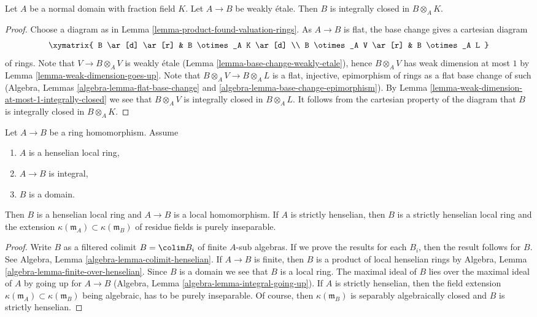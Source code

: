 \begin{lemma}
\label{lemma-normality-goes-up}
Let $A$ be a normal domain with fraction field $K$.
Let $A \to B$ be weakly \'etale. Then
$B$ is integrally closed in $B \otimes_A K$.
\end{lemma}

\begin{proof}
Choose a diagram as in Lemma \ref{lemma-product-found-valuation-rings}.
As $A \to B$ is flat, the base change gives a cartesian diagram
$$
\xymatrix{
B \ar[d] \ar[r] & B \otimes_A K \ar[d] \\
B \otimes_A V \ar[r] & B \otimes_A L
}
$$
of rings. Note that $V \to B \otimes_A V$ is weakly \'etale
(Lemma \ref{lemma-base-change-weakly-etale}), hence $B \otimes_A V$
has weak dimension at most $1$ by Lemma \ref{lemma-weak-dimension-goes-up}.
Note that $B \otimes_A V \to B \otimes_A L$ is a flat, injective,
epimorphism of rings as a flat base change of such
(Algebra, Lemmas \ref{algebra-lemma-flat-base-change} and
\ref{algebra-lemma-base-change-epimorphism}).
By Lemma \ref{lemma-weak-dimension-at-most-1-integrally-closed}
we see that $B \otimes_A V$ is integrally closed in $B \otimes_A L$.
It follows from the cartesian property of the diagram
that $B$ is integrally closed in $B \otimes_A K$.
\end{proof}

\begin{lemma}
\label{lemma-integral-over-henselian}
Let $A \to B$ be a ring homomorphism.
Assume
\begin{enumerate}
\item $A$ is a henselian local ring,
\item $A \to B$ is integral,
\item $B$ is a domain.
\end{enumerate}
Then $B$ is a henselian local ring and $A \to B$ is a local homomorphism.
If $A$ is strictly henselian, then $B$ is a strictly henselian local ring
and the extension $\kappa(\mathfrak m_A) \subset \kappa(\mathfrak m_B)$
of residue fields is purely inseparable.
\end{lemma}

\begin{proof}
Write $B$ as a filtered colimit $B = \colim B_i$ of finite $A$-sub algebras.
If we prove the results for each $B_i$, then the result follows for $B$.
See Algebra, Lemma \ref{algebra-lemma-colimit-henselian}.
If $A \to B$ is finite, then $B$ is a product of local henselian rings by
Algebra, Lemma \ref{algebra-lemma-finite-over-henselian}.
Since $B$ is a domain we see that $B$ is a local ring.
The maximal ideal of $B$ lies over the maximal ideal of $A$ by
going up for $A \to B$ (Algebra, Lemma \ref{algebra-lemma-integral-going-up}).
If $A$ is strictly henselian, then the field extension
$\kappa(\mathfrak m_A) \subset \kappa(\mathfrak m_B)$
being algebraic, has to be purely inseparable.
Of course, then $\kappa(\mathfrak m_B)$ is separably algebraically
closed and $B$ is strictly henselian.
\end{proof}


